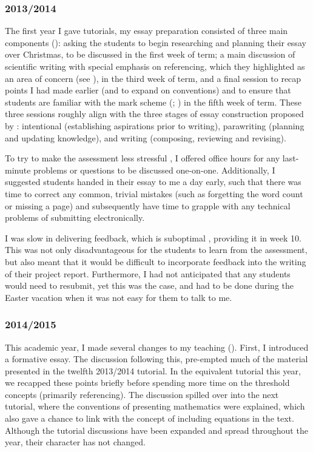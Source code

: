 \subsubsection{2013/2014}\label{sec:teach2013-14}

The first year I gave tutorials, my essay preparation consisted of three main components (): asking the students to begin researching and planning their essay over Christmas, to be discussed in the first week of term; a main discussion of scientific writing with special emphasis on referencing, which they highlighted as an area of concern (see ), in the third week of term, and a final session to recap points I had made earlier (and to expand on conventions) and to ensure that students are familiar with the mark scheme (\citealt[chapter 8]{Ramsden1992}; \citealt{Bell2012}) in the fifth week of term. These three sessions roughly align with the three stages of essay construction proposed by \citet{Biggs1988}: intentional (establishing aspirations prior to writing), parawriting (planning and updating knowledge), and writing (composing, reviewing and revising).

To try to make the assessment less stressful \citep[chapter 10]{Ramsden1992}, I offered office hours for any last-minute problems or questions to be discussed one-on-one. Additionally, I suggested students handed in their essay to me a day early, such that there was time to correct any common, trivial mistakes (such as forgetting the word count or missing a page) and subsequently have time to grapple with any technical problems of submitting electronically.

I was slow in delivering feedback, which is suboptimal \citep[chapter 4, and references therein]{Irons2008}, providing it in week 10. This was not only disadvantageous for the students to learn from the assessment, but also meant that it would be difficult to incorporate feedback into the writing of their project report. Furthermore, I had not anticipated that any students would need to resubmit, yet this was the case, and had to be done during the Easter vacation when it was not easy for them to talk to me.

\subsubsection{2014/2015}\label{sec:teach2014-15}

This academic year, I made several changes to my teaching (). First, I introduced a formative essay. The discussion following this, pre-empted much of the material presented in the twelfth 2013/2014 tutorial. In the equivalent tutorial this year, we recapped these points briefly before spending more time on the threshold concepts (primarily referencing). The discussion spilled over into the next tutorial, where the conventions of presenting mathematics were explained, which also gave a chance to link with the concept of including equations in the text. Although the tutorial discussions have been expanded and spread throughout the year, their character has not changed.

